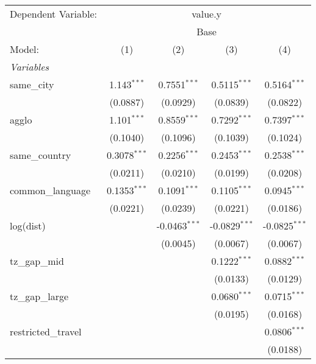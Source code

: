 
\begingroup
\centering
\begin{tabular}{lcccc}
   \tabularnewline \midrule \midrule
   Dependent Variable: & \multicolumn{4}{c}{value.y}\\
    & \multicolumn{4}{c}{Base} \\ 
   Model:              & (1)            & (2)             & (3)             & (4)\\  
   \midrule
   \emph{Variables}\\
   same\_city          & 1.143$^{***}$  & 0.7551$^{***}$  & 0.5115$^{***}$  & 0.5164$^{***}$\\   
                       & (0.0887)       & (0.0929)        & (0.0839)        & (0.0822)\\   
   agglo               & 1.101$^{***}$  & 0.8559$^{***}$  & 0.7292$^{***}$  & 0.7397$^{***}$\\   
                       & (0.1040)       & (0.1096)        & (0.1039)        & (0.1024)\\   
   same\_country       & 0.3078$^{***}$ & 0.2256$^{***}$  & 0.2453$^{***}$  & 0.2538$^{***}$\\   
                       & (0.0211)       & (0.0210)        & (0.0199)        & (0.0208)\\   
   common\_language    & 0.1353$^{***}$ & 0.1091$^{***}$  & 0.1105$^{***}$  & 0.0945$^{***}$\\   
                       & (0.0221)       & (0.0239)        & (0.0221)        & (0.0186)\\   
   log(dist)           &                & -0.0463$^{***}$ & -0.0829$^{***}$ & -0.0825$^{***}$\\   
                       &                & (0.0045)        & (0.0067)        & (0.0067)\\   
   tz\_gap\_mid        &                &                 & 0.1222$^{***}$  & 0.0882$^{***}$\\   
                       &                &                 & (0.0133)        & (0.0129)\\   
   tz\_gap\_large      &                &                 & 0.0680$^{***}$  & 0.0715$^{***}$\\   
                       &                &                 & (0.0195)        & (0.0168)\\   
   restricted\_travel  &                &                 &                 & 0.0806$^{***}$\\   
                       &                &                 &                 & (0.0188)\\   

\end{tabular}
